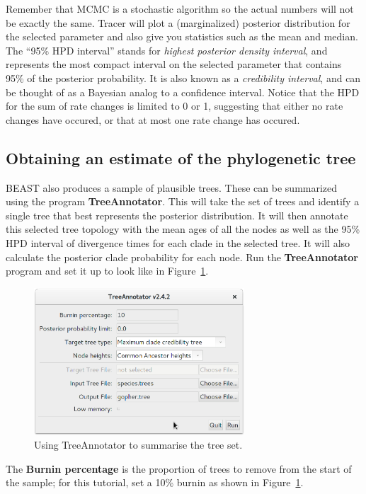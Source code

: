 \documentclass{article}
\begin{document}
Remember that MCMC is a stochastic algorithm so the actual numbers will not be
exactly the same. Tracer will plot a (marginalized) posterior distribution for
the selected parameter and also give you statistics such as the mean and median.
The ``95\% HPD interval'' stands for \textit{highest posterior density
interval}, and represents the most compact interval on the selected parameter
that contains 95\% of the posterior probability. It is also known as a
\textit{credibility interval}, and can be thought of as a Bayesian analog to a
confidence interval. Notice that the HPD for the sum of rate changes is limited
to 0 or 1, suggesting that either no rate changes have occured, or that at most
one rate change has occured.

\subsection*{Obtaining an estimate of the phylogenetic tree}

BEAST also produces a sample of plausible trees. These can be summarized using
the program \textbf{TreeAnnotator}. This will take the set of trees and identify
a single tree that best represents the posterior distribution. It will then
annotate this selected tree topology with the mean ages of all the nodes as well
as the 95\% HPD interval of divergence times for each clade in the selected
tree. It will also calculate the posterior clade probability for each node. Run
the \textbf{TreeAnnotator} program and set it up to look like in
Figure~\ref{fig:treeannotator}.

\begin{figure}[htb!]
\centering
\includegraphics[width=0.7\textwidth]{figures/treeannotator.png}
\caption{Using TreeAnnotator to summarise the tree set.}
\label{fig:treeannotator}
\end{figure}

The \textbf{Burnin percentage} is the proportion of trees to remove from the
start of the sample; for this tutorial, set a 10\% burnin as shown in
Figure~\ref{fig:treeannotator}.
\end{document}

